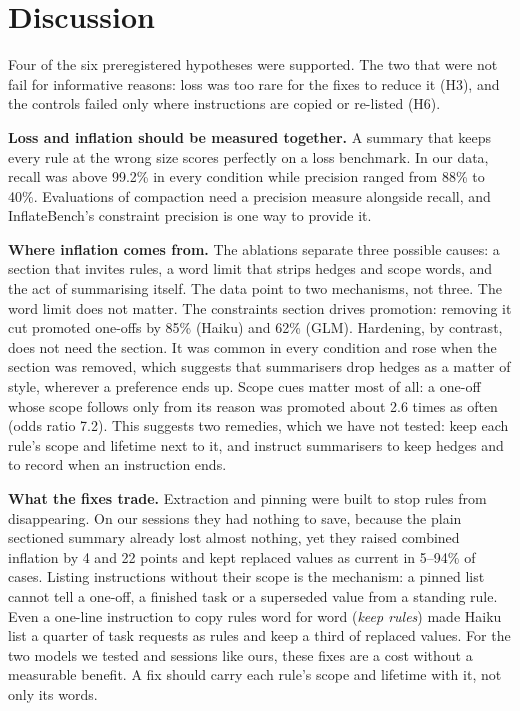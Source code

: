 \documentclass[fleqn,10pt]{wlscirep}
\begin{document}
\section*{Discussion}

Four of the six preregistered hypotheses were supported. The two that were not fail for informative reasons: loss was too rare for the fixes to reduce it (H3), and the controls failed only where instructions are copied or re-listed (H6).

\textbf{Loss and inflation should be measured together.} A summary that keeps every rule at the wrong size scores perfectly on a loss benchmark. In our data, recall was above 99.2\% in every condition while precision ranged from 88\% to 40\%. Evaluations of compaction need a precision measure alongside recall, and InflateBench's constraint precision is one way to provide it.

\textbf{Where inflation comes from.} The ablations separate three possible causes: a section that invites rules, a word limit that strips hedges and scope words, and the act of summarising itself. The data point to two mechanisms, not three. The word limit does not matter. The constraints section drives promotion: removing it cut promoted one-offs by 85\% (Haiku) and 62\% (GLM). Hardening, by contrast, does not need the section. It was common in every condition and rose when the section was removed, which suggests that summarisers drop hedges as a matter of style, wherever a preference ends up. Scope cues matter most of all: a one-off whose scope follows only from its reason was promoted about 2.6 times as often (odds ratio 7.2). This suggests two remedies, which we have not tested: keep each rule's scope and lifetime next to it, and instruct summarisers to keep hedges and to record when an instruction ends.

\textbf{What the fixes trade.} Extraction and pinning were built to stop rules from disappearing. On our sessions they had nothing to save, because the plain sectioned summary already lost almost nothing, yet they raised combined inflation by 4 and 22 points and kept replaced values as current in 5--94\% of cases. Listing instructions without their scope is the mechanism: a pinned list cannot tell a one-off, a finished task or a superseded value from a standing rule. Even a one-line instruction to copy rules word for word (\emph{keep rules}) made Haiku list a quarter of task requests as rules and keep a third of replaced values. For the two models we tested and sessions like ours, these fixes are a cost without a measurable benefit. A fix should carry each rule's scope and lifetime with it, not only its words.
\end{document}
